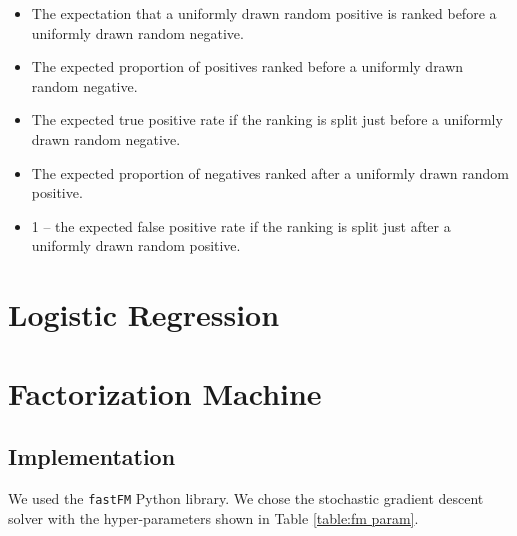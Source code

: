         \begin{itemize}
            \item The expectation that a uniformly drawn random positive is ranked before a uniformly drawn random negative.
            \item The expected proportion of positives ranked before a uniformly drawn random negative.
            \item The expected true positive rate if the ranking is split just before a uniformly drawn random negative.
            \item The expected proportion of negatives ranked after a uniformly drawn random positive.
            \item 1 – the expected false positive rate if the ranking is split just after a uniformly drawn random positive.
        \end{itemize}


\section{Logistic Regression}


\section{Factorization Machine}

    \subsection{Implementation}

        We used the \verb|fastFM|\cite{bayer_fastfm:_2016} Python library.
        We chose the stochastic gradient descent solver with the hyper-parameters shown in Table \ref{table:fm param}.

